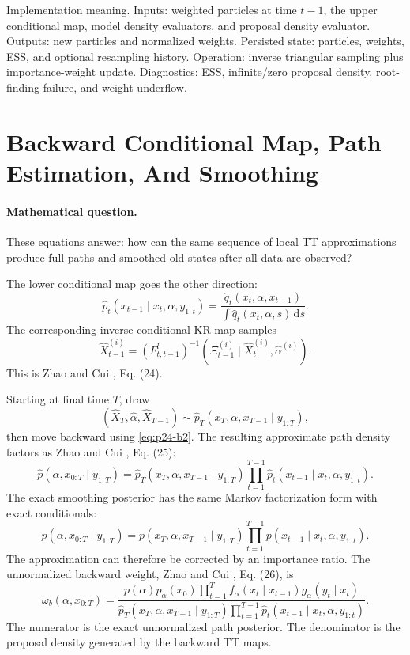 \documentclass[11pt]{article}
\newcommand{\dd}{\,\mathrm d}
\begin{document}
Implementation meaning. Inputs: weighted particles at time \(t-1\), the
upper conditional map, model density evaluators, and proposal density evaluator.
Outputs: new particles and normalized weights.  Persisted state: particles,
weights, ESS, and optional resampling history.  Operation: inverse triangular
sampling plus importance-weight update.  Diagnostics: ESS, infinite/zero
proposal density, root-finding failure, and weight underflow.

\section{Backward Conditional Map, Path Estimation, And Smoothing}

\paragraph{Mathematical question.}
These equations answer: how can the same sequence of local TT approximations
produce full paths and smoothed old states after all data are observed?

The lower conditional map goes the other direction:
\[
    \widehat p_t(x_{t-1}\mid x_t,\alpha,y_{1:t})
    =
    \frac{\widehat q_t(x_t,\alpha,x_{t-1})}
    {\int \widehat q_t(x_t,\alpha,s)\dd s}.
    \label{eq:p24-b1}
\]
The corresponding inverse conditional KR map samples
\[
    \widehat X_{t-1}^{(i)}
    =
    (F_{t,t-1}^{l})^{-1}
    \left(\Xi_{t-1}^{(i)}\mid \widehat X_t^{(i)},\widehat\alpha^{(i)}\right).
    \label{eq:p24-b2}
\]
This is Zhao and Cui \cite{zhao2024ttsequential}, Eq. (24).

Starting at final time \(T\), draw
\[
    (\widehat X_T,\widehat\alpha,\widehat X_{T-1})
    \sim
    \widehat p_T(x_T,\alpha,x_{T-1}\mid y_{1:T}),
\]
then move backward using \eqref{eq:p24-b2}.  The resulting approximate path density factors
as Zhao and Cui \cite{zhao2024ttsequential}, Eq. (25):
\[
    \widehat p(\alpha,x_{0:T}\mid y_{1:T})
    =
    \widehat p_T(x_T,\alpha,x_{T-1}\mid y_{1:T})
    \prod_{t=1}^{T-1}
    \widehat p_t(x_{t-1}\mid x_t,\alpha,y_{1:t}).
    \label{eq:p24-b3}
\]
The exact smoothing posterior has the same Markov factorization form with exact
conditionals:
\[
    p(\alpha,x_{0:T}\mid y_{1:T})
    =
    p(x_T,\alpha,x_{T-1}\mid y_{1:T})
    \prod_{t=1}^{T-1}
    p(x_{t-1}\mid x_t,\alpha,y_{1:t}).
    \label{eq:p24-b4}
\]
The approximation can therefore be corrected by an importance ratio.  The
unnormalized backward weight, Zhao and Cui \cite{zhao2024ttsequential}, Eq. (26), is
\[
    \omega_b(\alpha,x_{0:T})
    =
    \frac{
    p(\alpha)p_\alpha(x_0)
    \prod_{t=1}^{T}
    f_\alpha(x_t\mid x_{t-1})g_\alpha(y_t\mid x_t)}
    {
    \widehat p_T(x_T,\alpha,x_{T-1}\mid y_{1:T})
    \prod_{t=1}^{T-1}
    \widehat p_t(x_{t-1}\mid x_t,\alpha,y_{1:t})}.
    \label{eq:p24-b5}
\]
The numerator is the exact unnormalized path posterior.  The denominator is the
proposal density generated by the backward TT maps.
\end{document}
